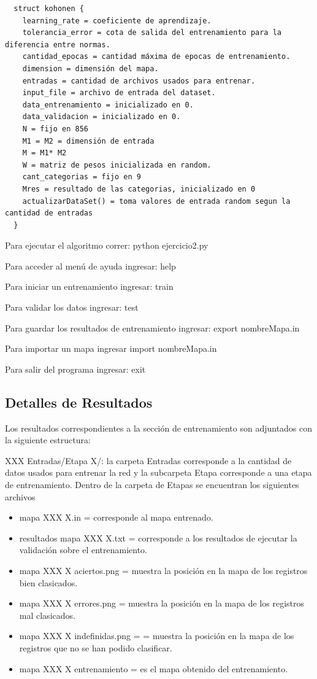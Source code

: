 \begin{lstlisting}
  struct kohonen {
    learning_rate = coeficiente de aprendizaje.
    tolerancia_error = cota de salida del entrenamiento para la diferencia entre normas.
    cantidad_epocas = cantidad máxima de epocas de entrenamiento.
    dimension = dimensión del mapa.
    entradas = cantidad de archivos usados para entrenar.
    input_file = archivo de entrada del dataset.
    data_entrenamiento = inicializado en 0.
    data_validacion = inicializado en 0.
    N = fijo en 856
    M1 = M2 = dimensión de entrada
    M = M1* M2 
    W = matriz de pesos inicializada en random.  
    cant_categorias = fijo en 9
    Mres = resultado de las categorias, inicializado en 0
    actualizarDataSet() = toma valores de entrada random segun la cantidad de entradas
  }
\end{lstlisting}

Para ejecutar el algoritmo correr: python ejercicio2.py

Para acceder al menú de ayuda ingresar: help

Para iniciar un entrenamiento ingresar: train

Para validar los datos ingresar: test

Para guardar los resultados de entrenamiento ingresar: export nombreMapa.in

Para importar un mapa ingresar import nombreMapa.in

Para salir del programa ingresar: exit


\subsection{Detalles de Resultados}

Los resultados correspondientes a la sección de entrenamiento son adjuntados con 
la siguiente estructura:

XXX Entradas/Etapa X/: la carpeta Entradas corresponde a la cantidad de datos usados para entrenar la red
y la subcarpeta Etapa corresponde a una etapa de entrenamiento. Dentro de la carpeta de
Etapas se encuentran los siguientes archivos

\begin{itemize}
	\item mapa XXX X.in =  corresponde al mapa entrenado.
	\item resultados mapa XXX X.txt = corresponde a los resultados de ejecutar la
validación sobre el entrenamiento.
	\item mapa XXX X aciertos.png = muestra la posición en la mapa de los registros bien clasicados.
	\item mapa XXX X errores.png = muestra la posición en la mapa de los registros mal clasicados.
	\item mapa XXX X indefinidas.png = = muestra la posición en la mapa de los registros que no
se han podido clasificar.
	\item mapa XXX X entrenamiento = es el mapa obtenido del entrenamiento.
\end{itemize}

